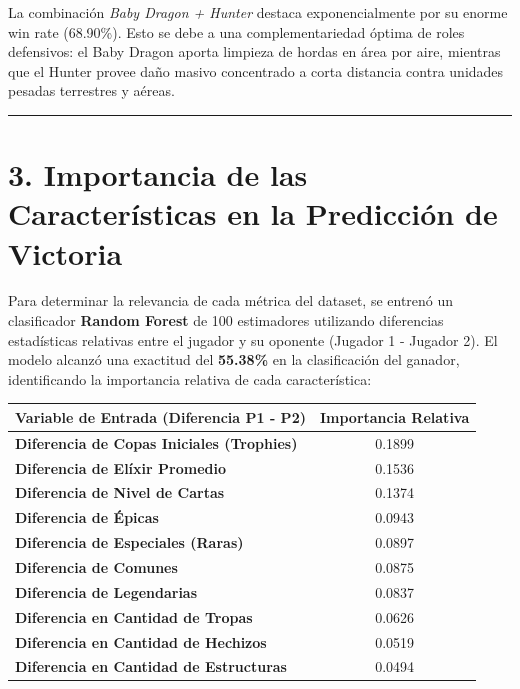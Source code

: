 \documentclass[
  spanish,
  12pt,
]{report}
\newcounter{none} %
\begin{document}
La combinación \emph{Baby Dragon + Hunter} destaca exponencialmente por
su enorme win rate (68.90\%). Esto se debe a una complementariedad
óptima de roles defensivos: el Baby Dragon aporta limpieza de hordas en
área por aire, mientras que el Hunter provee daño masivo concentrado a
corta distancia contra unidades pesadas terrestres y aéreas.

\begin{center}\rule{0.5\linewidth}{0.5pt}\end{center}

\section{3. Importancia de las Características en la Predicción de
Victoria}\label{importancia-de-las-caracteruxedsticas-en-la-predicciuxf3n-de-victoria}

Para determinar la relevancia de cada métrica del dataset, se entrenó un
clasificador \textbf{Random Forest} de 100 estimadores utilizando
diferencias estadísticas relativas entre el jugador y su oponente
(Jugador 1 - Jugador 2). El modelo alcanzó una exactitud del
\textbf{55.38\%} en la clasificación del ganador, identificando la
importancia relativa de cada característica:

{\def\LTcaptype{none} %
\begin{longtable}[]{@{}lc@{}}
\toprule\noalign{}
Variable de Entrada (Diferencia P1 - P2) & Importancia Relativa \\
\midrule\noalign{}
\endhead
\bottomrule\noalign{}
\endlastfoot
\textbf{Diferencia de Copas Iniciales (Trophies)} & 0.1899 \\
\textbf{Diferencia de Elíxir Promedio} & 0.1536 \\
\textbf{Diferencia de Nivel de Cartas} & 0.1374 \\
\textbf{Diferencia de Épicas} & 0.0943 \\
\textbf{Diferencia de Especiales (Raras)} & 0.0897 \\
\textbf{Diferencia de Comunes} & 0.0875 \\
\textbf{Diferencia de Legendarias} & 0.0837 \\
\textbf{Diferencia en Cantidad de Tropas} & 0.0626 \\
\textbf{Diferencia en Cantidad de Hechizos} & 0.0519 \\
\textbf{Diferencia en Cantidad de Estructuras} & 0.0494 \\
\end{longtable}
}
\end{document}
